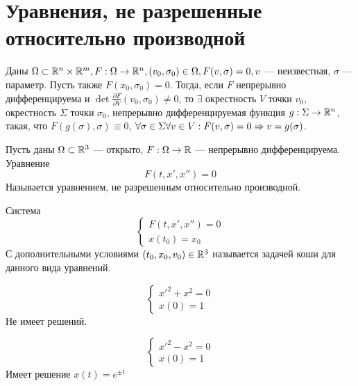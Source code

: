 

\section{Уравнения, не разрешенные относительно производной}

\begin{theorem}
    Даны \(\Omega \subset \mathbb{R}^n \times \mathbb{R}^m, F: \Omega \rightarrow \mathbb{R}^n, (v_0, \sigma_0) \in \Omega, F(v, \sigma) = 0, v\) --- неизвестная, \(\sigma\) --- параметр. Пусть также \(F(x_0, \sigma_0) = 0\). Тогда, если \(F\) непрерывно дифференцируема и \(\det\frac{\partial F}{\partial V}(v_0, \sigma_0) \ne 0\), то \(\exists \) окрестность \(V\) точки \(v_0\), окрестность \(\Sigma\) точки \(\sigma_0\), непрерывно дифференцируемая функция \(g: \Sigma \rightarrow \mathbb{R}^n\), такая, что \(F(g(\sigma), \sigma) 
    \equiv 0\), \(\forall \sigma \in \Sigma \forall v \in V: F(v, \sigma) = 0 \Rightarrow v = g(\sigma)\).
\end{theorem}

\begin{definition}
    Пусть даны \(\Omega \subset \mathbb{R}^3\) --- открыто, \(F: \Omega \rightarrow \mathbb{R}\) --- непрерывно дифференцируема. Уравнение
    \[F(t, x', x'') = 0\]
    Называется уравнением, не разрешенным относительно производной.
\end{definition}

\begin{definition}
    Система
    \begin{equation}
        \begin{cases}
            F(t, x', x'') = 0 \\
            x(t_0) = x_0
        \end{cases}
    \end{equation}
    С дополнительными условиями \((t_0, x_0, v_0) \in \mathbb{R}^3\) называется задачей коши для данного вида уравнений.
\end{definition}

\begin{example}
    \[\left\{\begin{array}{l}
        x'^2 + x^2 = 0 \\
        x(0) = 1
    \end{array}\right.\]
    Не имеет решений.
\end{example}

\begin{example}
    \[\left\{\begin{array}{l}
        x'^2 - x^2 = 0 \\
        x(0) = 1
    \end{array}\right.\]
    Имеет решение \(x(t) = e^{\pm t}\)
\end{example}

